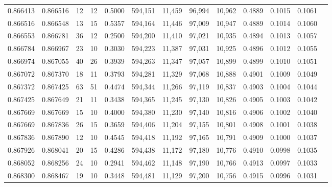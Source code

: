 \begin{tabular}{rrrrrrrrrrrrr}
0.866413 & 0.866516 &    12 &  12 &                                     0.5000 & 594,151 &  11,459 &  96,994 &  10,962 & 0.4889 & 0.1015 & 0.1061 \\
0.866516 & 0.866548 &    13 &  15 &                                     0.5357 & 594,164 &  11,446 &  97,009 &  10,947 & 0.4889 & 0.1014 & 0.1060 \\
0.866553 & 0.866781 &    36 &  12 &                                     0.2500 & 594,200 &  11,410 &  97,021 &  10,935 & 0.4894 & 0.1013 & 0.1057 \\
0.866784 & 0.866967 &    23 &  10 &                                     0.3030 & 594,223 &  11,387 &  97,031 &  10,925 & 0.4896 & 0.1012 & 0.1055 \\
0.866974 & 0.867055 &    40 &  26 &                                     0.3939 & 594,263 &  11,347 &  97,057 &  10,899 & 0.4899 & 0.1010 & 0.1051 \\
0.867072 & 0.867370 &    18 &  11 &                                     0.3793 & 594,281 &  11,329 &  97,068 &  10,888 & 0.4901 & 0.1009 & 0.1049 \\
0.867372 & 0.867425 &    63 &  51 &                                     0.4474 & 594,344 &  11,266 &  97,119 &  10,837 & 0.4903 & 0.1004 & 0.1044 \\
0.867425 & 0.867649 &    21 &  11 &                                     0.3438 & 594,365 &  11,245 &  97,130 &  10,826 & 0.4905 & 0.1003 & 0.1042 \\
0.867669 & 0.867669 &    15 &  10 &                                     0.4000 & 594,380 &  11,230 &  97,140 &  10,816 & 0.4906 & 0.1002 & 0.1040 \\
0.867669 & 0.867836 &    26 &  15 &                                     0.3659 & 594,406 &  11,204 &  97,155 &  10,801 & 0.4908 & 0.1001 & 0.1038 \\
0.867836 & 0.867890 &    12 &  10 &                                     0.4545 & 594,418 &  11,192 &  97,165 &  10,791 & 0.4909 & 0.1000 & 0.1037 \\
0.867926 & 0.868041 &    20 &  15 &                                     0.4286 & 594,438 &  11,172 &  97,180 &  10,776 & 0.4910 & 0.0998 & 0.1035 \\
0.868052 & 0.868256 &    24 &  10 &                                     0.2941 & 594,462 &  11,148 &  97,190 &  10,766 & 0.4913 & 0.0997 & 0.1033 \\
0.868300 & 0.868467 &    19 &  10 &                                     0.3448 & 594,481 &  11,129 &  97,200 &  10,756 & 0.4915 & 0.0996 & 0.1031 \\

\end{tabular}
